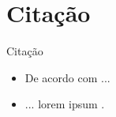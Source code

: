 \documentclass[aspectratio=169,english]{beamer}
\begin{document}
\section{Citação}
\begin{frame}{Citação}
    \begin{itemize}
        \item De acordo com  ...
        \item ... lorem ipsum \cite{fernandes2023}.
    \end{itemize}
\end{frame}


     
\end{document}
